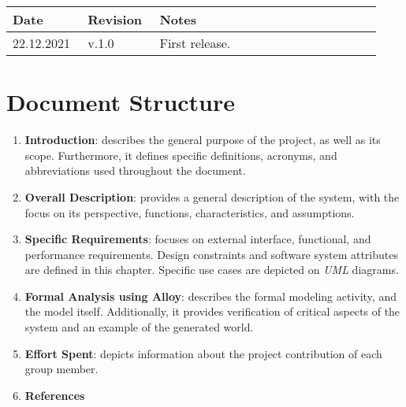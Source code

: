 \begin{center}
	\begin{longtable}{@{}p{0.18\linewidth} p{0.18\linewidth} p{0.57\linewidth}@{}}
		\toprule
		\textbf{Date}   & \textbf{Revision} & \textbf{Notes}\\
		\midrule
        22.12.2021      & v.1.0             & First release.\\
		\bottomrule
	\end{longtable}
\end{center}

\printbibliography[title={Reference Documents},keyword=intro, heading=subbibnumbered]

\section{Document Structure}

\begin{enumerate}
    \item \textbf{Introduction}: describes the general purpose of the project, as well as its scope. Furthermore, it defines specific definitions, acronyms, and abbreviations used throughout the document.
    \item \textbf{Overall Description}: provides a general description of the system, with the focus on its perspective, functions, characteristics, and assumptions.
    \item \textbf{Specific Requirements}: focuses on external interface, functional, and performance requirements. Design constraints and software system attributes are defined in this chapter. Specific use cases are depicted on \textit{UML} diagrams.
    \item \textbf{Formal Analysis using Alloy}: describes the formal modeling activity, and the model itself. Additionally, it provides verification of critical aspects of the system and an example of the generated world.
    \item \textbf{Effort Spent}: depicts information about the project contribution of each group member.
    \item \textbf{References}
\end{enumerate}
